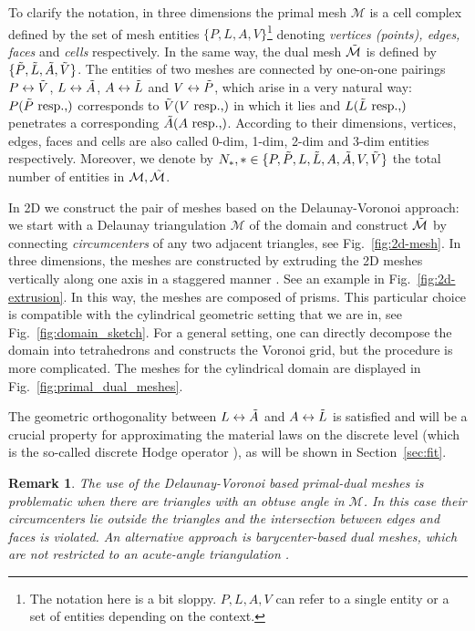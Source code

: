 \documentclass{article}
\newtheorem*{remark}{Remark}
\begin{document}
To clarify the notation, in three dimensions the primal mesh $\mathcal{M}$ is a cell
complex defined by the set of mesh entities $\{P, L, A, V\}$\footnote{The notation here is
  a bit sloppy. $P, L, A, V$ can refer to a single entity or a set of entities depending
  on the context.} denoting \emph{vertices (points), edges, faces} and \emph{cells}
respectively. In the same way, the dual mesh $\Tilde{\mathcal{M}}$ is defined by
$\{\Tilde{P}, \Tilde{L}, \Tilde{A}, \Tilde{V}\}$. The entities of two meshes are
connected by one-on-one pairings $P \leftrightarrow \Tilde{V}$,
$L \leftrightarrow \Tilde{A}$, $A \leftrightarrow \Tilde{L}$ and
$V \leftrightarrow \Tilde{P}$, which arise in a very natural way:
$P(\Tilde{P} \text{ resp.,})$ corresponds to $\Tilde{V}(V \text{ resp.,})$ in which it
lies and $L(\Tilde{L} \text{ resp.,})$ penetrates a corresponding
$\Tilde{A}(A \text{ resp.,})$. According to their dimensions, vertices, edges, faces and
cells are also called 0-dim, 1-dim, 2-dim and 3-dim entities respectively. Moreover, we
denote by $N_\ast, \ast \in \{P, \Tilde{P}, L, \Tilde{L},A, \Tilde{A},V, \Tilde{V}\}$ the
total number of entities in $\mathcal{M}, \Tilde{\mathcal{M}}$.

In 2D we construct the pair of meshes based on the Delaunay-Voronoi approach: we start with a
Delaunay triangulation $\mathcal{M}$ of the domain and construct $\Tilde{\mathcal{M}}$ by
connecting \emph{circumcenters} of any two adjacent triangles, see Fig.~\ref{fig:2d-mesh}.
In three dimensions, the meshes are constructed by extruding the 2D meshes vertically
along one axis in a staggered manner \cite[][Sec. 3.1]{Marrone_2001}. See an example in
Fig.~\ref{fig:2d-extrusion}. In this way, the meshes are composed of prisms. This
particular choice is compatible with the cylindrical geometric setting that we are in, see
Fig.~\ref{fig:domain_sketch}. For a general setting, one can directly decompose the domain
into tetrahedrons and constructs the Voronoi grid, but the procedure is more
complicated. The meshes for the cylindrical domain are displayed in
Fig.~\ref{fig:primal_dual_meshes}.

The geometric orthogonality between $L \leftrightarrow \Tilde{A}$ and
$A \leftrightarrow \Tilde{L}$ is satisfied and will be a crucial property for
approximating the material laws on the discrete level (which is the so-called discrete
Hodge operator \cite{hip_1999, bossavit1999}), as will be shown in Section~\ref{sec:fit}.

\begin{remark}
  The use of the Delaunay-Voronoi based primal-dual meshes is problematic when there are
  triangles with an obtuse angle in $\mathcal{M}$. In this case their circumcenters lie
  outside the triangles and the intersection between edges and faces is violated. An
  alternative approach is barycenter-based dual meshes, which are not restricted to an
  acute-angle triangulation \cite[][Sec. 4.2]{Marrone_2001}.
\end{remark}
\end{document}
